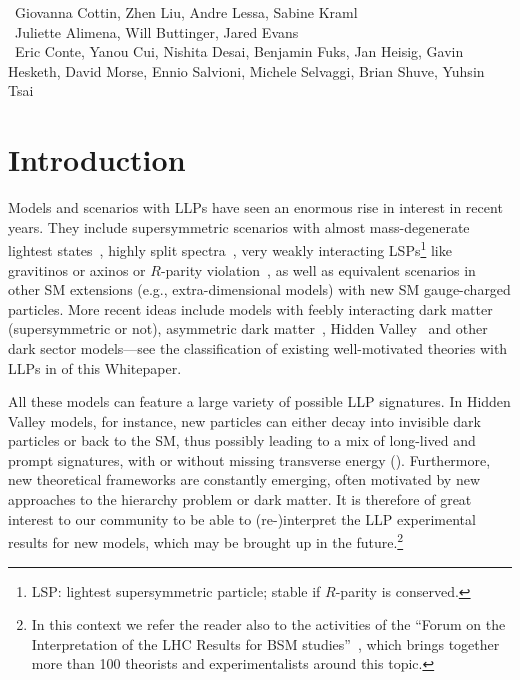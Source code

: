 ~Giovanna Cottin, Zhen Liu, Andre Lessa, Sabine Kraml\\
~Juliette Alimena, Will Buttinger, Jared Evans\\
~Eric Conte, Yanou Cui, Nishita Desai, Benjamin Fuks, Jan Heisig, Gavin Hesketh, David Morse, Ennio Salvioni, Michele Selvaggi, Brian Shuve, Yuhsin Tsai


\section{Introduction}
\label{sec:ch5-introduction}

Models and scenarios with LLPs have seen an enormous rise in interest in recent years.
They include supersymmetric scenarios with almost mass-degenerate lightest states~\cite{Chen:1995yu,Feng:1999fu}, 
highly split spectra~\cite{ArkaniHamed:2004fb,Giudice:2004tc}, 
very weakly interacting LSPs\footnote{LSP: lightest supersymmetric particle; stable if $R$-parity is conserved.} 
like gravitinos or axinos \cite{Pagels:1981ke,Covi:1999ty} or $R$-parity violation~\cite{Barbier:2004ez}, 
as well as equivalent scenarios in other SM extensions (e.g., extra-dimensional models) with new SM gauge-charged particles. 
More recent ideas include models with feebly interacting dark matter \cite{Hall:2009bx} (supersymmetric or not), asymmetric dark matter~\cite{Zurek:2013wia}, Hidden Valley~\cite{Strassler:2006im} and other dark sector models---see the classification of existing well-motivated 
theories with LLPs in  {} of this Whitepaper.

All these models can feature a large variety of possible LLP signatures. In Hidden Valley models, for instance,   
new particles can either decay into invisible dark particles or back to the SM, thus possibly leading to a 
mix of long-lived and prompt signatures, with or without missing transverse energy (\MET). 
Furthermore, new theoretical frameworks are constantly emerging, often motivated by 
new approaches to the hierarchy problem or dark matter. 
It is therefore of great interest to our community to be able to (re-)interpret the LLP experimental results 
for new models, which may be brought up in the future.\footnote{In this context we refer the reader also to 
the activities of the ``Forum on the Interpretation of the LHC Results for BSM studies''~\cite{reinterpretationForum}, which brings together more than 
100 theorists and experimentalists around this topic.}

